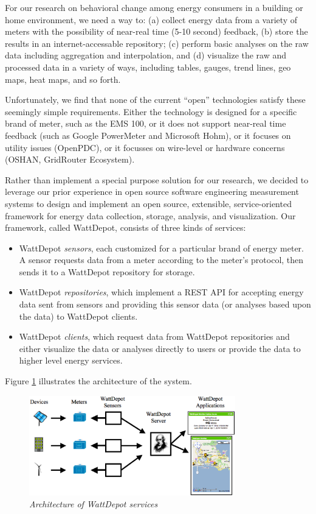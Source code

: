 \documentclass[conference,compsoc]{IEEEtran}
\begin{document}
For our research on behavioral change among energy consumers in a building
or home environment, we need a way to: (a) collect energy data from a
variety of meters with the possibility of near-real time (5-10 second)
feedback, (b) store the results in an internet-accessable repository; (c)
perform basic analyses on the raw data including aggregation and
interpolation, and (d) visualize the raw and processed data in a variety of
ways, including tables, gauges, trend lines, geo maps, heat maps, and so forth.

Unfortunately, we find that none of the current ``open'' technologies
satisfy these seemingly simple requirements. Either the technology is
designed for a specific brand of meter, such as the EMS 100, or it does not
support near-real time feedback (such as Google PowerMeter and Microsoft
Hohm), or it focuses on utility issues (OpenPDC), or it focusses on
wire-level or hardware concerns (OSHAN, GridRouter Ecosystem).

Rather than implement a special purpose solution for our research, we
decided to leverage our prior experience in open source software
engineering measurement systems to design and implement an open source,
extensible, service-oriented framework for energy data collection, storage,
analysis, and visualization. Our framework, called WattDepot, consists of
three kinds of services:

\begin{itemize}
\item WattDepot {\em sensors}, each customized for a particular brand of
energy meter.  A sensor requests data from a meter according to the meter's
protocol, then sends it to a WattDepot repository for storage.

\item WattDepot {\em repositories}, which implement a REST \cite{REST} API
for accepting energy data sent from sensors and providing this sensor data
(or analyses based upon the data) to WattDepot clients.

\item WattDepot {\em clients}, which request data from WattDepot
repositories and either visualize the data or analyses directly to users or
provide the data to higher level energy services.
\end{itemize}

Figure \ref{fig:architecture} illustrates the architecture of the system.

\begin{figure}[!th]
  \center
  \includegraphics[width=0.8\textwidth]{architecture.eps}
  \caption{\em \small Architecture of WattDepot services}
  \label{fig:architecture}
\end{figure} 
\end{document}
